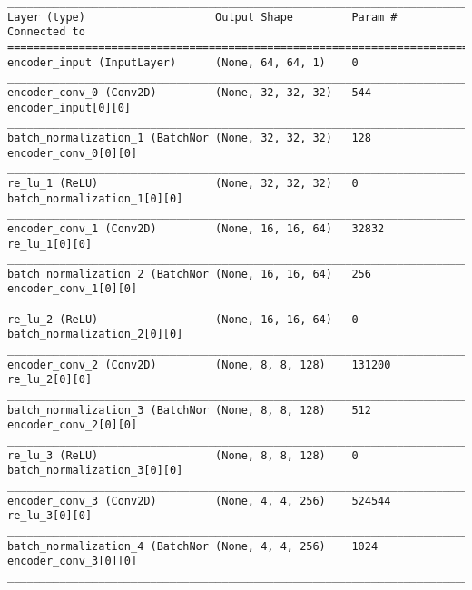 \begin{lstlisting}[caption={(dSprites, 7,500, 6,250, 5,000, 3,750)-VAE Encoder},captionpos=b,basicstyle=\tiny, label={lst:dsprites-vae-encoder}]
__________________________________________________________________________________________________
Layer (type)                    Output Shape         Param #     Connected to
==================================================================================================
encoder_input (InputLayer)      (None, 64, 64, 1)    0
__________________________________________________________________________________________________
encoder_conv_0 (Conv2D)         (None, 32, 32, 32)   544         encoder_input[0][0]
__________________________________________________________________________________________________
batch_normalization_1 (BatchNor (None, 32, 32, 32)   128         encoder_conv_0[0][0]
__________________________________________________________________________________________________
re_lu_1 (ReLU)                  (None, 32, 32, 32)   0           batch_normalization_1[0][0]
__________________________________________________________________________________________________
encoder_conv_1 (Conv2D)         (None, 16, 16, 64)   32832       re_lu_1[0][0]
__________________________________________________________________________________________________
batch_normalization_2 (BatchNor (None, 16, 16, 64)   256         encoder_conv_1[0][0]
__________________________________________________________________________________________________
re_lu_2 (ReLU)                  (None, 16, 16, 64)   0           batch_normalization_2[0][0]
__________________________________________________________________________________________________
encoder_conv_2 (Conv2D)         (None, 8, 8, 128)    131200      re_lu_2[0][0]
__________________________________________________________________________________________________
batch_normalization_3 (BatchNor (None, 8, 8, 128)    512         encoder_conv_2[0][0]
__________________________________________________________________________________________________
re_lu_3 (ReLU)                  (None, 8, 8, 128)    0           batch_normalization_3[0][0]
__________________________________________________________________________________________________
encoder_conv_3 (Conv2D)         (None, 4, 4, 256)    524544      re_lu_3[0][0]
__________________________________________________________________________________________________
batch_normalization_4 (BatchNor (None, 4, 4, 256)    1024        encoder_conv_3[0][0]
__________________________________________________________________________________________________

\end{lstlisting}
